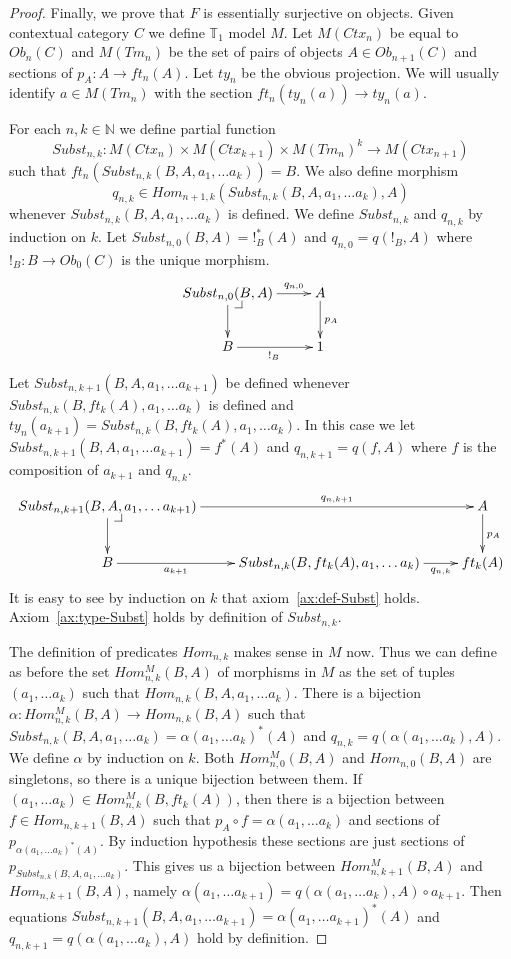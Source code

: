 \documentclass{amsart}
\makeatletter
\theoremstyle{definition}
\theoremstyle{remark}
\numberwithin{figure}{section}
\newcommand{\pb}[1][dr]{\save*!/#1-1.2pc/#1:(-1,1)@^{|-}\restore}
\makeatother
\begin{document}
\begin{proof}
Finally, we prove that $F$ is essentially surjective on objects.
Given contextual category $C$ we define $\mathbb{T}_1$ model $M$.
Let $M(Ctx_n)$ be equal to $Ob_n(C)$ and $M(Tm_n)$ be the set of pairs of objects $A \in Ob_{n+1}(C)$ and sections of $p_A : A \to ft_n(A)$.
Let $ty_n$ be the obvious projection.
We will usually identify $a \in M(Tm_n)$ with the section $ft_n(ty_n(a)) \to ty_n(a)$.

For each $n,k \in \mathbb{N}$ we define partial function
\[ Subst_{n,k} : M(Ctx_n) \times M(Ctx_{k+1}) \times M(Tm_n)^k \to M(Ctx_{n+1}) \]
such that $ft_n(Subst_{n,k}(B, A, a_1, \ldots a_k)) = B$.
We also define morphism
\[ q_{n,k} \in Hom_{n+1,k}(Subst_{n,k}(B, A, a_1, \ldots a_k), A) \]
whenever $Subst_{n,k}(B, A, a_1, \ldots a_k)$ is defined.
We define $Subst_{n,k}$ and $q_{n,k}$ by induction on $k$.
Let $Subst_{n,0}(B,A) = !_B^*(A)$ and $q_{n,0} = q(!_B,A)$ where $!_B : B \to Ob_0(C)$ is the unique morphism.
\[ \xymatrix{ Subst_{n,0}(B,A) \ar[r]^-{q_{n,0}} \ar[d] \pb & A \ar[d]^{p_A} \\
              B \ar[r]_{!_B} & 1
            } \]
Let $Subst_{n,k+1}(B, A, a_1, \ldots a_{k+1})$ be defined whenever $Subst_{n,k}(B, ft_k(A), a_1, \ldots a_k)$ is defined and $ty_n(a_{k+1}) = Subst_{n,k}(B, ft_k(A), a_1, \ldots a_k)$.
In this case we let $Subst_{n,k+1}(B, A, a_1, \ldots a_{k+1}) = f^*(A)$ and $q_{n,k+1} = q(f,A)$ where $f$ is the composition of $a_{k+1}$ and $q_{n,k}$.
\[ \xymatrix{ Subst_{n,k+1}(B, A, a_1, \ldots a_{k+1}) \ar[rr]^-{q_{n,k+1}} \ar[d] \pb & & A \ar[d]^{p_A} \\
              B \ar[r]_-{a_{k+1}} & Subst_{n,k}(B, ft_k(A), a_1, \ldots a_k) \ar[r]_-{q_{n,k}} & ft_k(A)
            } \]
It is easy to see by induction on $k$ that axiom~\eqref{ax:def-Subst} holds.
Axiom~\eqref{ax:type-Subst} holds by definition of $Subst_{n,k}$.

The definition of predicates $Hom_{n,k}$ makes sense in $M$ now.
Thus we can define as before the set $Hom^M_{n,k}(B,A)$ of morphisms in $M$ as the set of tuples $(a_1, \ldots a_k)$ such that $Hom_{n,k}(B, A, a_1, \ldots a_k)$.
There is a bijection $\alpha : Hom^M_{n,k}(B,A) \to Hom_{n,k}(B,A)$ such that $Subst_{n,k}(B, A, a_1, \ldots a_k) = \alpha(a_1, \ldots a_k)^*(A)$ and $q_{n,k} = q(\alpha(a_1, \ldots a_k), A)$.
We define $\alpha$ by induction on $k$.
Both $Hom^M_{n,0}(B,A)$ and $Hom_{n,0}(B,A)$ are singletons, so there is a unique bijection between them.
If $(a_1, \ldots a_k) \in Hom^M_{n,k}(B,ft_k(A))$, then there is a bijection between $f \in Hom_{n,k+1}(B,A)$ such that $p_A \circ f = \alpha(a_1, \ldots a_k)$ and sections of $p_{\alpha(a_1, \ldots a_k)^*(A)}$.
By induction hypothesis these sections are just sections of $p_{Subst_{n,k}(B, A, a_1, \ldots a_k)}$.
This gives us a bijection between $Hom^M_{n,k+1}(B,A)$ and $Hom_{n,k+1}(B,A)$, namely $\alpha(a_1, \ldots a_{k+1}) = q(\alpha(a_1, \ldots a_k), A) \circ a_{k+1}$.
Then equations $Subst_{n,k+1}(B, A, a_1, \ldots a_{k+1}) = \alpha(a_1, \ldots a_{k+1})^*(A)$ and $q_{n,k+1} = q(\alpha(a_1, \ldots a_k), A)$ hold by definition.


\end{proof}
\end{document}
